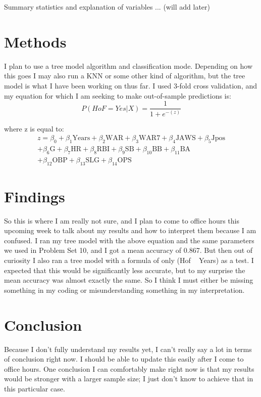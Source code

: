 \documentclass[12pt]{article}
\begin{document}
Summary statistics and explanation of variables ... (will add later)

\section{Methods}
\setlength{\parindent}{15pt}
I plan to use a tree model algorithm and classification mode. Depending on how this goes I may also run a KNN or some other kind of algorithm, but the tree model is what I have been working on thus far. I used 3-fold cross validation, and my equation for which I am seeking to make out-of-sample predictions is:
\begin{equation}
P(HoF=Yes|X) = \frac{1}{1 + e^{-(z)}}
\end{equation}

where z is equal to:
\begin{equation}
\begin{split}    
z = \beta_0 + \beta_1 \text{Years} + \beta_2 \text{WAR} + \beta_3 \text{WAR7} + \beta_4 \text{JAWS} + \beta_5 \text{Jpos}  \\
+ \beta_6 \text{G} + \beta_7 \text{HR} + \beta_8 \text{RBI} + \beta_9 \text{SB} + \beta_{10} \text{BB} + \beta_{11} \text{BA} \\
+ \beta_{12} \text{OBP} + \beta_{13} \text{SLG} + \beta_{14} \text{OPS}
\end{split}
\end{equation}

\section{Findings}
\setlength{\parindent}{15pt}
So this is where I am really not sure, and I plan to come to office hours this upcoming week to talk about my results and how to interpret them because I am confused. I ran my tree model with the above equation and the same parameters we used in Problem Set 10, and I got a mean accuracy of 0.867. But then out of curiosity I also ran a tree model with a formula of only (Hof ~ Years) as a test. I expected that this would be significantly less accurate, but to my surprise the mean accuracy was almost exactly the same. So I think I must either be missing something in my coding or misunderstanding something in my interpretation. 

\section{Conclusion}
\setlength{\parindent}{15pt}
Because I don't fully understand my results yet, I can't really say a lot in terms of conclusion right now. I should be able to update this easily after I come to office hours. One conclusion I can comfortably make right now is that my results would be stronger with a larger sample size; I just don't know to achieve that in this particular case.
\end{document}
